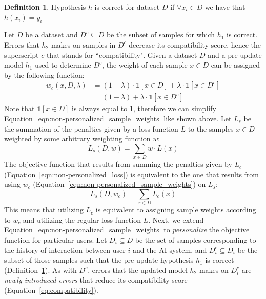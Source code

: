 \documentclass[letterpaper]{article}
\theoremstyle{definition}
\newtheorem{definition}{Definition}
\begin{document}
\begin{definition}
Hypothesis  $h$  is correct for  dataset $D$ if
$\forall x_i \in D$ we have that $h(x_i)=y_i$
\label{def:hypCorrect}
\end{definition}
Let $D$ be a dataset and $D^c\subseteq D$ be the subset of samples for which $h_1$ is correct. Errors that $h_2$ makes on samples in $D^c$ decrease its compatibility score, hence the superscript $c$ that stands for ``compatibility". Given a dataset $D$ and a pre-update model $h_1$ used to determine $D^c$, the weight of each sample $x\in D$ can be assigned by the following function:
\begin{align}
\label{eqn:non-personalized_sample_weights}
w_c(x,D,\lambda)&=(1-\lambda)\cdot\mathbb{1}[x\in D]+\lambda\cdot\mathbb{1}[x\in D^c] \\  \nonumber
&=(1-\lambda) + \lambda\cdot\mathbb{1}[x\in D^c]
\end{align}
Note that $\mathbb{1}[x\in D]$ is always equal to $1$, therefore we can simplify Equation~\ref{eqn:non-personalized_sample_weights} like shown above. Let $L_s$ be the summation of the penalties given by a loss function $L$ to the samples $x\in D$ weighted by some arbitrary weighting function $w$:
\begin{equation}
\label{eqn:loss_summation}
L_s(D,w) = \sum_{x \in D} w \cdot L(x)
\end{equation}
The objective function that results from summing the penalties given by $L_c$ (Equation~\ref{eqn:non-personalized_loss}) is equivalent to the one that results from using $w_c$ (Equation~\ref{eqn:non-personalized_sample_weights}) on $L_s$:
\begin{equation}
\label{eqn:Ls_equals_Lc}
L_s(D,w_c) = \sum_{x \in D}L_c(x)
\end{equation}
This means that utilizing $L_c$ is equivalent to assigning sample weights according to $w_c$ and utilizing the regular loss function $L$. Next, we extend Equation~\ref{eqn:non-personalized_sample_weights} to  \textit{personalize} the objective function for  particular users.
Let $D_i\subseteq D$ be the set of samples corresponding to the  history of interaction between user $i$ and the AI-system, and $D_i^c \subseteq D_i$ be the subset of those samples such that
the pre-update hypothesis $h_1$ is correct (Definition~\ref{def:hypCorrect}). As with $D^c$, errors that the updated model $h_2$ makes on $D_i^c$ are \textit{newly introduced errors} that reduce its compatibility score (Equation~\ref{eq:compatibility}).
\end{document}
